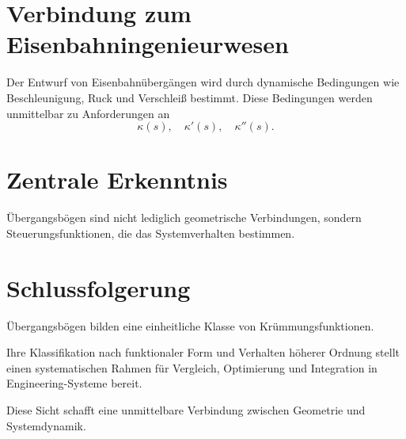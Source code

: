 \section{Verbindung zum Eisenbahningenieurwesen}
Der Entwurf von Eisenbahnübergängen wird durch dynamische Bedingungen wie
Beschleunigung, Ruck und Verschleiß bestimmt. Diese Bedingungen werden
unmittelbar zu Anforderungen an
\[
\kappa(s),\quad\kappa'(s),\quad\kappa''(s).
\]

\section{Zentrale Erkenntnis}
\begin{theorem}
Übergangsbögen sind nicht lediglich geometrische Verbindungen, sondern
Steuerungsfunktionen, die das Systemverhalten bestimmen.
\end{theorem}

\section{Schlussfolgerung}
\begin{summary}
Übergangsbögen bilden eine einheitliche Klasse von Krümmungsfunktionen.

Ihre Klassifikation nach funktionaler Form und Verhalten höherer Ordnung
stellt einen systematischen Rahmen für Vergleich, Optimierung und Integration
in Engineering-Systeme bereit.

Diese Sicht schafft eine unmittelbare Verbindung zwischen Geometrie und
Systemdynamik.
\end{summary}

